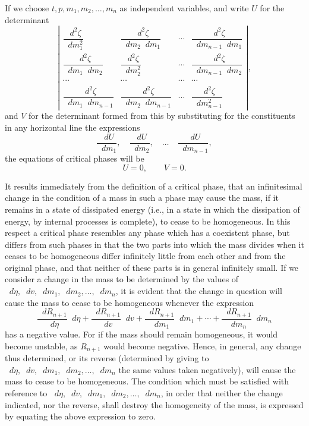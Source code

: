 \documentclass[11pt]{article}
\newcommand{\dd}{\mathop{}\!d}
\begin{document}
If we choose $t,p,m_1,m_2,\ldots,m_n$ as independent variables, and write $U$ for the determinant
\begin{equation}\label{eq:gibbs-v1-p3-206}
\left|
\begin{array}{cccc}
\dfrac{\dd^2\zeta}{\dd m_1^2} &
\dfrac{\dd^2\zeta}{\dd m_2\dd m_1} & \cdots &
\dfrac{\dd^2\zeta}{\dd m_{n-1}\dd m_1}\\[0.9em]
\dfrac{\dd^2\zeta}{\dd m_1\dd m_2} &
\dfrac{\dd^2\zeta}{\dd m_2^2} & \cdots &
\dfrac{\dd^2\zeta}{\dd m_{n-1}\dd m_2}\\
\cdots & \cdots & \cdots & \cdots\\
\dfrac{\dd^2\zeta}{\dd m_1\dd m_{n-1}} &
\dfrac{\dd^2\zeta}{\dd m_2\dd m_{n-1}} & \cdots &
\dfrac{\dd^2\zeta}{\dd m_{n-1}^2}
\end{array}
\right|,
\tag{206}
\end{equation}
and $V$ for the determinant formed from this by substituting for the constituents in any horizontal line the expressions
\begin{equation}\label{eq:gibbs-v1-p3-207}
\frac{\dd U}{\dd m_1},\quad
\frac{\dd U}{\dd m_2},\quad \ldots \quad
\frac{\dd U}{\dd m_{n-1}},
\tag{207}
\end{equation}
the equations of critical phases will be
\begin{equation}\label{eq:gibbs-v1-p3-208}
U=0,\qquad V=0.
\tag{208}
\end{equation}

It results immediately from the definition of a critical phase, that an infinitesimal change in the condition of a mass in such a phase may cause the mass, if it remains in a state of dissipated energy (i.e., in a state in which the dissipation of energy, by internal processes is complete), to cease to be homogeneous. In this respect a critical phase resembles any phase which has a coexistent phase, but differs from such phases in that the two parts into which the mass divides when it ceases to be homogeneous differ infinitely little from each other and from the original phase, and that neither of these parts is in general infinitely small. If we consider a change in the mass to be determined by the values of $\dd\eta,\dd v,\dd m_1,\dd m_2,\ldots,\dd m_n$, it is evident that the change in question will cause the mass to cease to be homogeneous whenever the expression
\begin{equation}\label{eq:gibbs-v1-p3-209}
\frac{\dd R_{n+1}}{\dd\eta}\dd\eta
+\frac{\dd R_{n+1}}{\dd v}\dd v
+\frac{\dd R_{n+1}}{\dd m_1}\dd m_1
+\cdots+
\frac{\dd R_{n+1}}{\dd m_n}\dd m_n
\tag{209}
\end{equation}
has a negative value. For if the mass should remain homogeneous, it would become unstable, as $R_{n+1}$ would become negative. Hence, in general, any change thus determined, or its reverse (determined by giving to $\dd\eta,\dd v,\dd m_1,\dd m_2,\ldots,\dd m_n$ the same values taken negatively), will cause the mass to cease to be homogeneous. The condition which must be satisfied with reference to $\dd\eta,\dd v,\dd m_1,\dd m_2,\ldots,\dd m_n$, in order that neither the change indicated, nor the reverse, shall destroy the homogeneity of the mass, is expressed by equating the above expression to zero.
\end{document}
